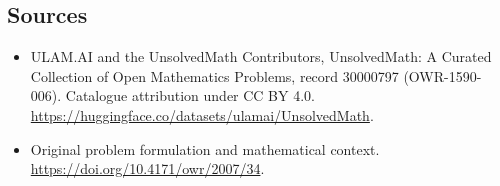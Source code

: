 \documentclass[11pt]{article}
\begin{document}
\subsection{Sources}
\begin{itemize}
\item[\hypertarget{source:30000797:1}{S1}] ULAM.AI and the UnsolvedMath Contributors, UnsolvedMath: A Curated Collection of Open Mathematics Problems, record 30000797 (OWR-1590-006). Catalogue attribution under CC BY 4.0.
\url{https://huggingface.co/datasets/ulamai/UnsolvedMath}.
\item[\hypertarget{source:30000797:2}{S2}] Original problem formulation and mathematical context.
\url{https://doi.org/10.4171/owr/2007/34}.
\end{itemize}
\label{end:30000797}
\end{document}
